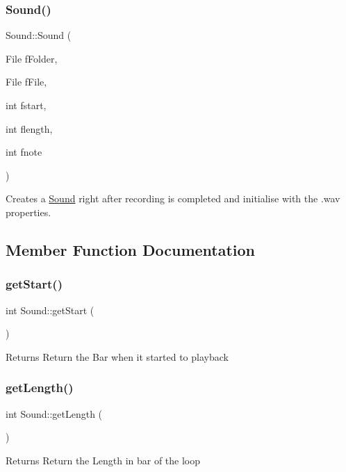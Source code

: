 \subsubsection{\texorpdfstring{Sound()}{Sound()}}
{\footnotesize\ttfamily Sound\+::\+Sound (\begin{DoxyParamCaption}\item[{File}]{f\+Folder,  }\item[{File}]{f\+File,  }\item[{int}]{fstart,  }\item[{int}]{flength,  }\item[{int}]{fnote }\end{DoxyParamCaption})}

Creates a \mbox{\hyperlink{class_sound}{Sound}} right after recording is completed and initialise with the .wav properties. 

\subsection{Member Function Documentation}
\mbox{\label{class_sound_abdc20b1e2d151987ad6958749693a622}} 
\subsubsection{\texorpdfstring{getStart()}{getStart()}}
{\footnotesize\ttfamily int Sound\+::get\+Start (\begin{DoxyParamCaption}{ }\end{DoxyParamCaption})}

\begin{DoxyReturn}{Returns}
Return the Bar when it started to playback 
\end{DoxyReturn}
\mbox{\label{class_sound_a621ec3a749962543eea4d64a789b38b4}} 
\subsubsection{\texorpdfstring{getLength()}{getLength()}}
{\footnotesize\ttfamily int Sound\+::get\+Length (\begin{DoxyParamCaption}{ }\end{DoxyParamCaption})}

\begin{DoxyReturn}{Returns}
Return the Length in bar of the loop 
\end{DoxyReturn}
\mbox{\label{class_sound_a13c91185d1fd706bccb1ee4eb1b36645}} 
